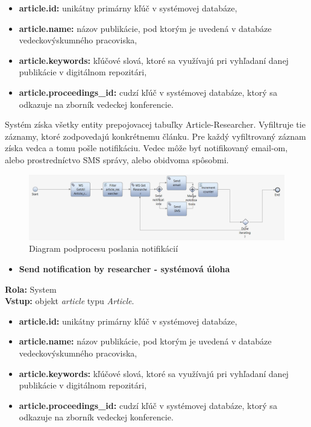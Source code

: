 \documentclass[10pt,oneside,slovak,a4paper]{article}
\begin{document}
\begin{itemize}
\item \textbf{article.id:} unikátny primárny kľúč v systémovej databáze,
\item \textbf{article.name:} názov publikácie, pod ktorým je uvedená v databáze vedeckovýskumného pracoviska,
\item \textbf{article.keywords:} kľúčové slová, ktoré sa využívajú pri vyhľadaní danej publikácie v digitálnom repozitári,
\item \textbf{article.proceedings\_id:} cudzí kľúč v systémovej databáze, ktorý sa odkazuje na zborník vedeckej konferencie.
\end{itemize}

Systém získa všetky entity prepojovacej tabuľky Article-Researcher. Vyfiltruje tie záznamy, ktoré zodpovedajú konkrétnemu článku. Pre každý vyfiltrovaný záznam získa vedca a tomu pošle notifikáciu. Vedec môže byť notifikovaný email-om, alebo prostredníctvo SMS správy, alebo obidvoma spôsobmi.

\begin{figure} [H]
\centering
\includegraphics[scale=0.4]{diagrams/diagNotification.jpg} 
\caption{Diagram podprocesu poslania notifikácií}
\end{figure}

\begin{itemize}
\item \textbf{Send notification by researcher - systémová úloha}
\end{itemize}

\textbf{Rola:} System\\
\textbf{Vstup:} objekt \textit{article} typu \textit{Article}.

\begin{itemize}
\item \textbf{article.id:} unikátny primárny kľúč v systémovej databáze,
\item \textbf{article.name:} názov publikácie, pod ktorým je uvedená v databáze vedeckovýskumného pracoviska,
\item \textbf{article.keywords:} kľúčové slová, ktoré sa využívajú pri vyhľadaní danej publikácie v digitálnom repozitári,
\item \textbf{article.proceedings\_id:} cudzí kľúč v systémovej databáze, ktorý sa odkazuje na zborník vedeckej konferencie.
\end{itemize}
\end{document}
